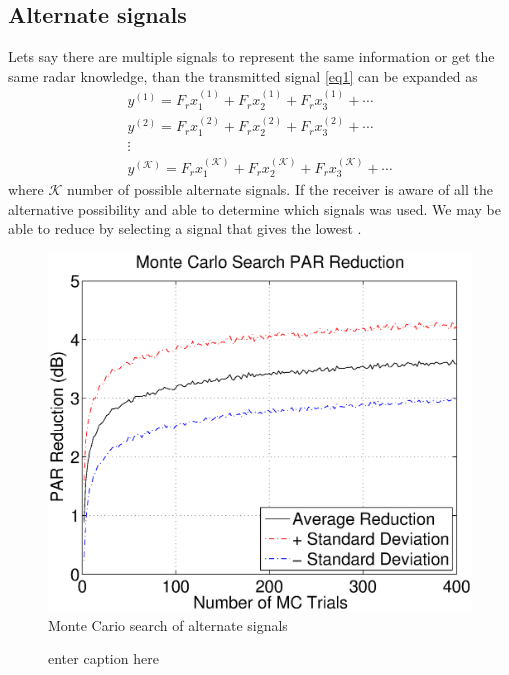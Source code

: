 \documentclass[conference]{IEEEtran}
\begin{document}
\subsection{Alternate signals}
Lets say there are multiple signals to represent the same information or get the same radar knowledge, than the transmitted signal \eqref{eq1} can be expanded as
\begin{gather*}
y^{(1)}=F_rx_1^{(1)}+F_rx_2^{(1)}+F_rx_3^{(1)}+\cdots \\
y^{(2)}=F_rx_1^{(2)}+F_rx_2^{(2)}+F_rx_3^{(2)}+\cdots \\
\vdots \\
y^{(\mathcal{K})}=F_rx_1^{(\mathcal{K})}+F_rx_2^{(\mathcal{K})}+F_rx_3^{(\mathcal{K})}+\cdots
\end{gather*}
where $\mathcal{K}$ number of possible alternate signals. If the receiver is aware of all the alternative possibility and able to determine which signals was used.  We may be able to reduce \PAR by selecting a signal that gives the lowest \PAR.  
\begin{figure}
  \includegraphics[width=\linewidth]{MCFig.eps}
  \caption{Monte Cario search of alternate signals}
\end{figure}

\begin{figure} %
  \centering
  \caption{enter caption here}%
  \label{fig:compsim2}
\end{figure}





\end{document}

